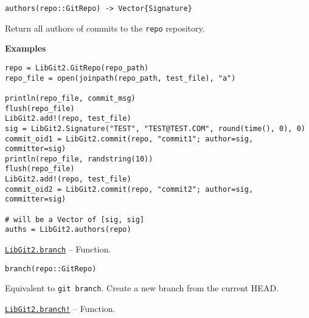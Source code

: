 \begin{adjustwidth}{2em}{0pt}


\begin{verbatim}
authors(repo::GitRepo) -> Vector{Signature}
\end{verbatim}

Return all authors of commits to the \texttt{repo} repository.

\textbf{Examples}


\begin{verbatim}
repo = LibGit2.GitRepo(repo_path)
repo_file = open(joinpath(repo_path, test_file), "a")

println(repo_file, commit_msg)
flush(repo_file)
LibGit2.add!(repo, test_file)
sig = LibGit2.Signature("TEST", "TEST@TEST.COM", round(time(), 0), 0)
commit_oid1 = LibGit2.commit(repo, "commit1"; author=sig, committer=sig)
println(repo_file, randstring(10))
flush(repo_file)
LibGit2.add!(repo, test_file)
commit_oid2 = LibGit2.commit(repo, "commit2"; author=sig, committer=sig)

# will be a Vector of [sig, sig]
auths = LibGit2.authors(repo)
\end{verbatim}



\end{adjustwidth}
\hypertarget{17976386758924249721}{}
\hyperlink{17976386758924249721}{\texttt{LibGit2.branch}}  -- {Function.}

\begin{adjustwidth}{2em}{0pt}


\begin{verbatim}
branch(repo::GitRepo)
\end{verbatim}

Equivalent to \texttt{git branch}. Create a new branch from the current HEAD.



\end{adjustwidth}
\hypertarget{10282470573382896007}{}
\hyperlink{10282470573382896007}{\texttt{LibGit2.branch!}}  -- {Function.}

